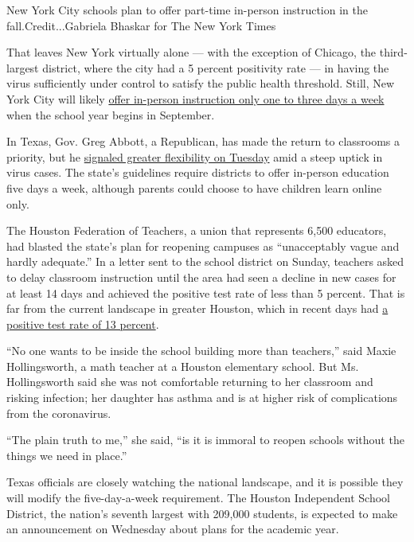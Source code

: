 New York City schools plan to offer part-time in-person instruction in
the fall.Credit...Gabriela Bhaskar for The New York Times

That leaves New York virtually alone --- with the exception of Chicago,
the third-largest district, where the city had a 5 percent positivity
rate --- in having the virus sufficiently under control to satisfy the
public health threshold. Still, New York City will likely
\href{https://www.nytimes.com/2020/07/08/nyregion/nyc-schools-reopening-plan.html}{offer
in-person instruction only one to three days a week} when the school
year begins in September.

In Texas, Gov. Greg Abbott, a Republican, has made the return to
classrooms a priority, but he
\href{https://www.texastribune.org/2020/07/14/texas-schools-online-pandemic/}{signaled
greater flexibility on Tuesday} amid a steep uptick in virus cases. The
state's guidelines require districts to offer in-person education five
days a week, although parents could choose to have children learn online
only.

The Houston Federation of Teachers, a union that represents 6,500
educators, had blasted the state's plan for reopening campuses as
``unacceptably vague and hardly adequate.'' In a letter sent to the
school district on Sunday, teachers asked to delay classroom instruction
until the area had seen a decline in new cases for at least 14 days and
achieved the positive test rate of less than 5 percent. That is far from
the current landscape in greater Houston, which in recent days had
\href{https://www.tmc.edu/coronavirus-updates/covid-19-testing-trends/}{a
positive test rate of 13 percent}.

``No one wants to be inside the school building more than teachers,''
said Maxie Hollingsworth, a math teacher at a Houston elementary school.
But Ms. Hollingsworth said she was not comfortable returning to her
classroom and risking infection; her daughter has asthma and is at
higher risk of complications from the coronavirus.

``The plain truth to me,'' she said, ``is it is immoral to reopen
schools without the things we need in place.''

Texas officials are closely watching the national landscape, and it is
possible they will modify the five-day-a-week requirement. The Houston
Independent School District, the nation's seventh largest with 209,000
students, is expected to make an announcement on Wednesday about plans
for the academic year.

